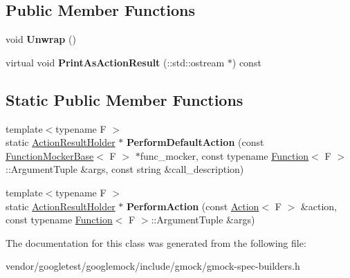 \subsection*{Public Member Functions}
\begin{DoxyCompactItemize}
\item 
void {\bfseries Unwrap} ()\hypertarget{classtesting_1_1internal_1_1ActionResultHolder_3_01void_01_4_aa57f371e1559b236e6424b2f50dcd6a2}{}\label{classtesting_1_1internal_1_1ActionResultHolder_3_01void_01_4_aa57f371e1559b236e6424b2f50dcd6a2}

\item 
virtual void {\bfseries Print\+As\+Action\+Result} (\+::std\+::ostream $\ast$) const \hypertarget{classtesting_1_1internal_1_1ActionResultHolder_3_01void_01_4_a6729c4fe6c33485ece4fbcfea8806e49}{}\label{classtesting_1_1internal_1_1ActionResultHolder_3_01void_01_4_a6729c4fe6c33485ece4fbcfea8806e49}

\end{DoxyCompactItemize}
\subsection*{Static Public Member Functions}
\begin{DoxyCompactItemize}
\item 
{\footnotesize template$<$typename F $>$ }\\static \hyperlink{classtesting_1_1internal_1_1ActionResultHolder}{Action\+Result\+Holder} $\ast$ {\bfseries Perform\+Default\+Action} (const \hyperlink{classtesting_1_1internal_1_1FunctionMockerBase}{Function\+Mocker\+Base}$<$ F $>$ $\ast$func\+\_\+mocker, const typename \hyperlink{structtesting_1_1internal_1_1Function}{Function}$<$ F $>$\+::Argument\+Tuple \&args, const string \&call\+\_\+description)\hypertarget{classtesting_1_1internal_1_1ActionResultHolder_3_01void_01_4_a140b6ab6a756e60db62e76b01b09a26f}{}\label{classtesting_1_1internal_1_1ActionResultHolder_3_01void_01_4_a140b6ab6a756e60db62e76b01b09a26f}

\item 
{\footnotesize template$<$typename F $>$ }\\static \hyperlink{classtesting_1_1internal_1_1ActionResultHolder}{Action\+Result\+Holder} $\ast$ {\bfseries Perform\+Action} (const \hyperlink{classtesting_1_1Action}{Action}$<$ F $>$ \&action, const typename \hyperlink{structtesting_1_1internal_1_1Function}{Function}$<$ F $>$\+::Argument\+Tuple \&args)\hypertarget{classtesting_1_1internal_1_1ActionResultHolder_3_01void_01_4_abb1d387e21341393e0c237ae7b02ee68}{}\label{classtesting_1_1internal_1_1ActionResultHolder_3_01void_01_4_abb1d387e21341393e0c237ae7b02ee68}

\end{DoxyCompactItemize}


The documentation for this class was generated from the following file\+:\begin{DoxyCompactItemize}
\item 
vendor/googletest/googlemock/include/gmock/gmock-\/spec-\/builders.\+h\end{DoxyCompactItemize}

